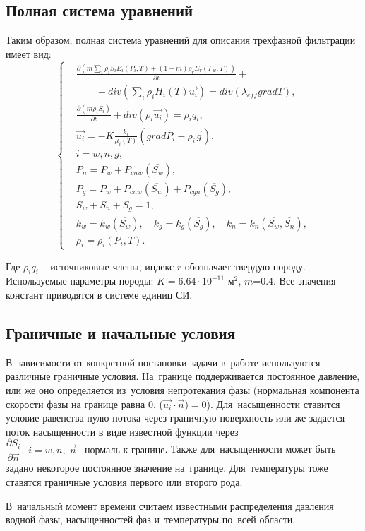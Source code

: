\subsection{Полная система уравнений}
Таким образом, полная система уравнений для описания трехфазной фильтрации
имеет вид:
\begin{equation}
\left\{
  \begin{aligned}
    &\frac{\partial \left(m {\sum\limits_{i}{\rho_i S_i E_i(P_i, T)}} + (1-m){\rho_r E_r(P_w, T)}\right)}{\partial t} + \\
    & \qquad + div(\sum_{i}{\rho_i H_i(T) \overrightarrow{u_i}}) = div(\lambda_{eff} grad T), \\
    &\frac{\partial (m \rho_i S_i)}{\partial t}+ div(\rho_i \overrightarrow{u_i}) = \rho_i q_i, \\
    &\overrightarrow{u_i}=-K \frac{k_i}{{\mu_i(T)}}(grad P_i - {\rho}_i\overrightarrow{g}), \\
    &i=w,n,g, \\
    &P_n=P_w+P_{cnw}(\overline{S_w}), \\
    &P_g=P_w+P_{cnw}(\overline{S_w})+P_{cgn}(\overline{S_g}), \\
    &S_w + S_n + S_g=1, \\
    &k_w=k_w(\overline{S_w}),\quad k_g=k_g(\overline{S_g}),\quad k_n=k_n(\overline{S_w},\overline{S_n}), \\
    &\rho_i=\rho_i(P_i,T).
  \end{aligned}
\right.
\end{equation}

Где $\rho_i q_i$ -- источниковые члены, индекс $r$ обозначает твердую породу.
Используемые параметры породы: $K=6.64\cdot 10^{-11}$ м$^2$, $m$=0.4.
Все значения констант приводятся в системе единиц СИ.

\subsection{Граничные и начальные условия}
В~зависимости от конкретной постановки задачи в~работе используются различные
граничные условия. На~границе поддерживается постоянное давление, или же оно
определяется из~условия непротекания фазы (нормальная компонента скорости
фазы на границе равна 0, ($\overrightarrow{u_i} \cdot \overrightarrow{n}) = 0$).
Для~насыщенности ставится условие равенства нулю потока через граничную 
поверхность или же задается поток насыщенности в виде известной функции через 
$ \dfrac{\partial S_i}{\partial \overrightarrow{n}}, \; i=w,n, \; \overrightarrow{n} \text{-- нормаль к границе} $.
Также для~насыщенности может быть задано некоторое постоянное значение на~границе.
Для~температуры тоже ставятся граничные условия первого или второго рода. 

В~начальный момент времени считаем известными распределения давления водной 
фазы, насыщенностей фаз и~температуры по~всей области.
